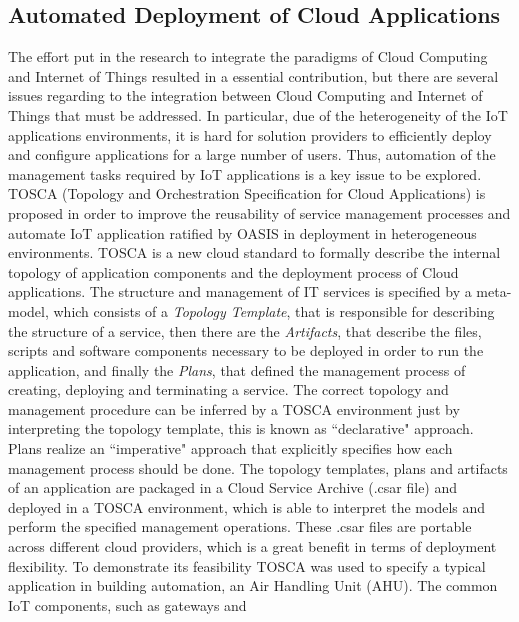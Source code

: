 \subsection{Automated Deployment of Cloud Applications}
\label{sub:Automated Deployment of IoT Applications}
The effort put in the research to integrate the paradigms of Cloud Computing and Internet
of Things resulted in a essential contribution, but there are several issues regarding to the
integration between Cloud Computing and Internet of Things that must be addressed. In particular,
due of the heterogeneity of the IoT applications environments, it is hard for solution providers
to efficiently deploy and configure applications for a large number of users. Thus, automation of
the management tasks required by IoT applications is a key issue to be explored.\\
TOSCA (Topology and Orchestration Specification for Cloud Applications) \cite{li2013towards} is
proposed in order to improve the reusability of service management processes and automate IoT application
ratified by OASIS in \cite{} deployment in heterogeneous environments. TOSCA is a new cloud standard to formally
describe the internal topology of application components and the deployment process of Cloud applications.
The structure and management of IT services is specified by a meta-model, which consists of
a \textit{Topology Template}, that is responsible for describing the structure of a service, then there
are the \textit{Artifacts}, that describe the files, scripts and software components necessary to be
deployed in order to run the application, and finally the \textit{Plans}, that defined the management process
of creating, deploying and terminating a service. The correct topology and management procedure can be inferred
by a TOSCA environment just by interpreting the topology template, this is known as ``declarative" approach.
Plans realize an ``imperative" approach that explicitly specifies how each management process should be done.
The topology templates, plans and artifacts of an application are packaged in a Cloud Service Archive (.csar file)
and deployed in a TOSCA environment, which is able to interpret the models and perform the specified management
operations. These .csar files are portable across different cloud providers, which is a great benefit in terms
of deployment flexibility. To demonstrate its feasibility TOSCA was used to specify a typical application in
building automation, an Air Handling Unit (AHU). The common IoT components, such as gateways and
